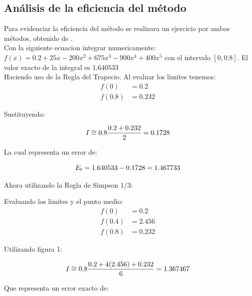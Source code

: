 \documentclass[journal,transmag]{IEEEtran}
\theoremstyle{mytheoremstyle}
\theoremstyle{mytheoremstyle}
\theoremstyle{myproblemstyle}
\begin{document}
    \subsection{Análisis de la eficiencia del método}
        
        Para evidenciar la eficiencia del método se realizara un ejercicio por ambos métodos, obtenido de \cite{chapra_merthod_2007}. \\

        Con la siguiente ecuacion integrar numericamente: $f(x) = 0.2 + 25x -200x^2 +675x^3 -900x^4 +400x^5$ con el intervalo $[0,0.8]$. 
        El valor exacto de la integral es $1.640533$ \\
        
        Haciendo uso de la Regla del Trapecio.
        Al evaluar los limites tenemos:
        \begin{align}
            f(0) &= 0.2 \\
            f(0.8) &= 0.232
        \end{align}

        Sustituyendo:

        \begin{equation} \notag
            I \cong 0.8 \frac{0.2 +  0.232}{2} = 0.1728
        \end{equation}

        La cual representa un error de:

        \begin{equation} \notag
            E_t = 1.640533 - 0.1728 = 1.467733
        \end{equation}

        Ahora utilizando la Regla de Simpson $1/3$:

        Evaluando los limites y el punto medio:
        \begin{align}
            f(0) &= 0.2 \\
            f(0.4) &= 2.456 \\
            f(0.8) &= 0.232
        \end{align} 

        Utilizando figura 1:

        \begin{equation} \notag
            I \cong 0.8 \frac{0.2 + 4(2.456) + 0.232}{6} = 1.367467
        \end{equation}

        Que representa un error exacto de:

\end{document}
